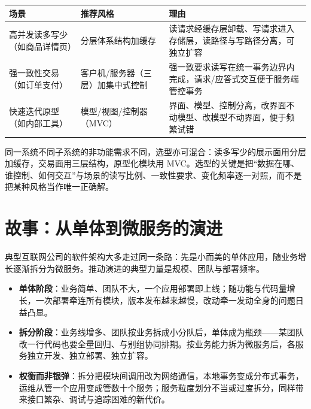 \documentclass[12pt,a4paper,twoside,openany]{ctexbook}
\numberwithin{figure}{chapter}
\numberwithin{table}{chapter}
\providecommand{\tightlist}{\setlength{\itemsep}{0pt}\setlength{\parskip}{0pt}}
\newcounter{none}
\begin{document}
{\def\LTcaptype{none} %
\begin{longtable}[]{@{}
  >{\raggedright\arraybackslash}p{}
  >{\raggedright\arraybackslash}p{}
  >{\raggedright\arraybackslash}p{}@{}}
\toprule\noalign{}
\begin{minipage}[b]{\linewidth}\raggedright
场景
\end{minipage} & \begin{minipage}[b]{\linewidth}\raggedright
推荐风格
\end{minipage} & \begin{minipage}[b]{\linewidth}\raggedright
理由
\end{minipage} \\
\midrule\noalign{}
\endhead
\bottomrule\noalign{}
\endlastfoot
高并发读多写少（如商品详情页） & 分层体系结构加缓存 &
读请求经缓存层卸载、写请求进入存储层，读路径与写路径分离，可独立扩容 \\
强一致性交易（如订单支付） & 客户机/服务器（三层）加集中式控制 &
强一致要求读写在统一事务边界内完成，请求/应答式交互便于服务端管控事务 \\
快速迭代原型（如内部工具） & 模型/视图/控制器（MVC） &
界面、模型、控制分离，改界面不动模型、改模型不动界面，便于频繁试错 \\
\end{longtable}
}

同一系统不同子系统的非功能需求不同，选型亦可混合：读多写少的展示面用分层加缓存，交易面用三层结构，原型化模块用
MVC。选型的关键是把``数据在哪、谁控制、如何交互''与场景的读写比例、一致性要求、变化频率逐一对照，而不是把某种风格当作唯一正确解。

\section{故事：从单体到微服务的演进}\label{ux6545ux4e8bux4eceux5355ux4f53ux5230ux5faeux670dux52a1ux7684ux6f14ux8fdb}

典型互联网公司的软件架构大多走过同一条路：先是小而美的单体应用，随业务增长逐渐拆分为微服务。推动演进的典型力量是规模、团队与部署频率。

\begin{itemize}
\tightlist
\item
  \textbf{单体阶段}：业务简单、团队不大，一个应用部署即上线；随功能与代码量增长，一次部署牵连所有模块，版本发布越来越慢，改动牵一发动全身的问题日益凸显。
\item
  \textbf{拆分阶段}：业务线增多、团队按业务拆成小分队后，单体成为瓶颈------某团队改一行代码也要全量回归、与别组协同排期。按业务能力拆为微服务后，各服务独立开发、独立部署、独立扩容。
\item
  \textbf{权衡而非银弹}：拆分把模块间调用改为网络通信，本地事务变成分布式事务，运维从管一个应用变成管数十个服务；服务粒度划分不当或过度拆分，同样带来接口繁杂、调试与追踪困难的新代价。
\end{itemize}
\end{document}
